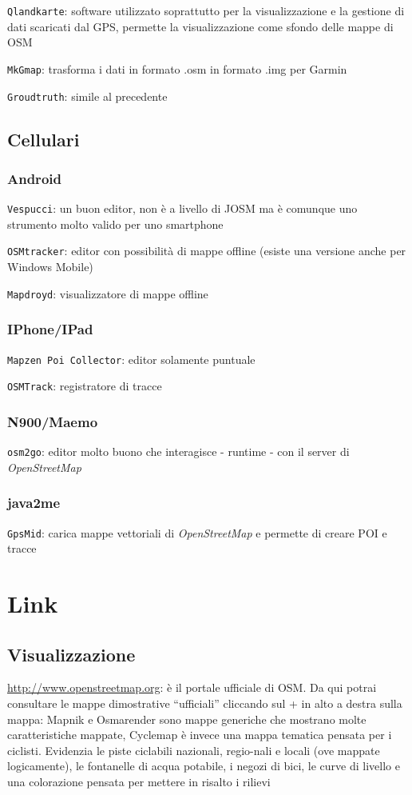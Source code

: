 \documentclass[a4paper,twoside,12pt,]{article}
\newcommand{\osm}{\emph{OpenStreetMap}\xspace}
\newcommand{\gps}{GPS\xspace}
\newcommand{\soft}[1]{\texttt{#1}}
\begin{document}
\soft{Qlandkarte}: software utilizzato soprattutto per la visualizzazione e la gestione di dati scaricati dal \gps, permette la visualizzazione come sfondo delle mappe di OSM

\soft{MkGmap}: trasforma i dati in formato .osm in formato .img per Garmin

\soft{Groudtruth}: simile al precedente

\subsection{Cellulari}
\subsubsection{Android}

\soft{Vespucci}: un buon editor, non è a livello di JOSM ma è comunque uno strumento molto valido per uno smartphone

\soft{OSMtracker}: editor con possibilità di mappe offline (esiste una versione anche per Windows Mobile)

\soft{Mapdroyd}: visualizzatore di mappe offline
\subsubsection{IPhone/IPad}

\soft{Mapzen Poi Collector}: editor solamente puntuale

\soft{OSMTrack}: registratore di tracce
\subsubsection{N900/Maemo}

\soft{osm2go}: editor molto buono che interagisce - runtime - con il server di \osm
\subsubsection{java2me}

\soft{GpsMid}: carica mappe vettoriali di \osm e permette di creare POI e tracce

\section{Link}
\subsection{Visualizzazione}
\url{http://www.openstreetmap.org}: è il portale ufficiale di OSM. Da qui potrai consultare le mappe dimostrative “ufficiali” cliccando sul + in alto a destra sulla mappa:
Mapnik e Osmarender sono mappe generiche che mostrano molte caratteristiche mappate,
Cyclemap è invece una mappa tematica pensata per i ciclisti. Evidenzia le piste ciclabili nazionali, regio-nali e locali (ove mappate logicamente), le fontanelle di acqua potabile, i negozi di bici, le curve di livello e una colorazione pensata per mettere in risalto i rilievi
\end{document}

